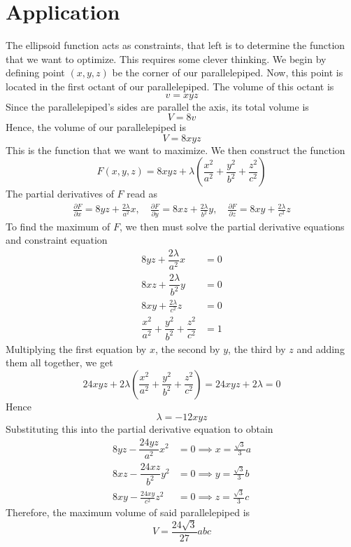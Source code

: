 \documentclass[twocolumn]{article}
\begin{document}
\section{Application}
The ellipsoid function acts as constraints, that left is to determine the function that we want to optimize. This requires some clever thinking. We begin by defining point $(x,y,z)$ be the corner of our parallelepiped. Now, this point is located in the first octant of our parallelepiped. The volume of this octant is 
\begin{equation}
    v=xyz
\end{equation}
Since the parallelepiped's sides are parallel the axis, its total volume is 
\begin{equation}
    V=8v
\end{equation}
Hence, the volume of our parallelepiped is 
\begin{equation}
    V=8xyz
\end{equation}
This is the function that we want to maximize. We then construct the function
\begin{equation}
    F(x,y,z)=8xyz+\lambda\left(\frac{x^2}{a^2}+\frac{y^2}{b^2}+\frac{z^2}{c^2}\right)
\end{equation}
The partial derivatives of $F$ read as 
\begin{align}
    \frac{\partial F}{\partial x}=8yz+\frac{2\lambda}{a^2}x,\quad
    \frac{\partial F}{\partial y}=8xz+\frac{2\lambda}{b^2}y,\quad
    \frac{\partial F}{\partial z}=8xy+\frac{2\lambda}{c^2}z
\end{align}
To find the maximum of $F$, we then must solve the partial derivative equations and constraint equation 
\begin{align}
    8yz+\dfrac{2\lambda}{a^2}x&=0\\
    8xz+\dfrac{2\lambda}{b^2}y&=0\\
    8xy+\frac{2\lambda}{c^2}z&=0\\
    \dfrac{x^2}{a^2}+\dfrac{y^2}{b^2}+\dfrac{z^2}{c^2}&=1
\end{align}
Multiplying the first equation by $x$, the second by $y$, the third by $z$ and adding them all together, we get 
\begin{equation}
    24xyz+2\lambda\left(\dfrac{x^2}{a^2}+\dfrac{y^2}{b^2}+\dfrac{z^2}{c^2}\right) = 24xyz+2\lambda=0
\end{equation}
Hence
\begin{equation}
    \lambda=-12xyz
\end{equation}
Substituting this into the partial derivative equation to obtain
\begin{align}
    8yz-\dfrac{24yz}{a^2}x^2&=0\implies x=\frac{\sqrt{3}}{3}a\\
    8xz-\dfrac{24xz}{b^2}y^2&=0\implies y=\frac{\sqrt{3}}{3}b\\
    8xy-\frac{24xy}{c^2}z^2&=0\implies z=\frac{\sqrt{3}}{3}c
\end{align}
Therefore, the maximum volume of said parallelepiped is 
\begin{equation}
    V=\frac{24\sqrt{3}}{27}abc
\end{equation}
\end{document}
